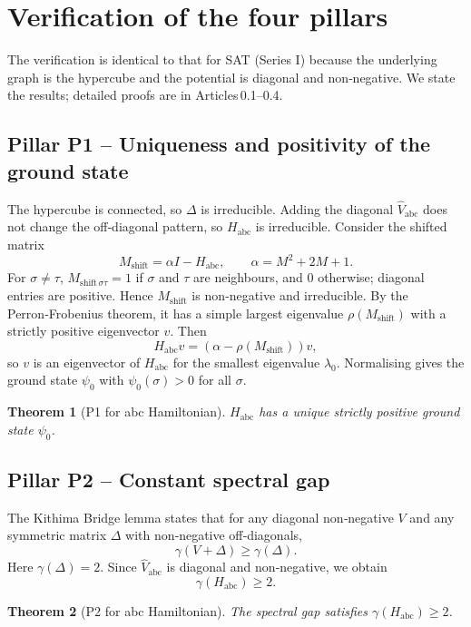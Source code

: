 \documentclass[11pt,a4paper]{article}
\newtheorem{theorem}{Theorem}[section]
\begin{document}
\section{Verification of the four pillars}

The verification is identical to that for SAT (Series I) because the underlying graph is the hypercube and the potential is diagonal and non‑negative. We state the results; detailed proofs are in Articles 0.1–0.4.

\subsection{Pillar P1 – Uniqueness and positivity of the ground state}
The hypercube is connected, so $\Delta$ is irreducible. Adding the diagonal $\hat{V}_{\text{abc}}$ does not change the off‑diagonal pattern, so $H_{\text{abc}}$ is irreducible. Consider the shifted matrix
\[
M_{\text{shift}} = \alpha I - H_{\text{abc}},\qquad \alpha = M^2 + 2M + 1.
\]
For $\sigma\neq\tau$, $M_{\text{shift}\,\sigma\tau} = 1$ if $\sigma$ and $\tau$ are neighbours, and $0$ otherwise; diagonal entries are positive. Hence $M_{\text{shift}}$ is non‑negative and irreducible. By the Perron‑Frobenius theorem, it has a simple largest eigenvalue $\rho(M_{\text{shift}})$ with a strictly positive eigenvector $v$. Then
\[
H_{\text{abc}} v = (\alpha - \rho(M_{\text{shift}})) v,
\]
so $v$ is an eigenvector of $H_{\text{abc}}$ for the smallest eigenvalue $\lambda_0$. Normalising gives the ground state $\psi_0$ with $\psi_0(\sigma) > 0$ for all $\sigma$.

\begin{theorem}[P1 for abc Hamiltonian]
$H_{\text{abc}}$ has a unique strictly positive ground state $\psi_0$.
\end{theorem}

\subsection{Pillar P2 – Constant spectral gap}
The Kithima Bridge lemma states that for any diagonal non‑negative $V$ and any symmetric matrix $\Delta$ with non‑negative off‑diagonals,
\[
\gamma(V + \Delta) \ge \gamma(\Delta).
\]
Here $\gamma(\Delta) = 2$. Since $\hat{V}_{\text{abc}}$ is diagonal and non‑negative, we obtain
\[
\gamma(H_{\text{abc}}) \ge 2.
\]

\begin{theorem}[P2 for abc Hamiltonian]
The spectral gap satisfies $\gamma(H_{\text{abc}}) \ge 2$.
\end{theorem}
\end{document}
